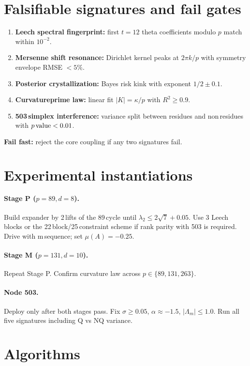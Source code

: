 \documentclass[11pt]{article}
\theoremstyle{definition}
\begin{document}
\section{Falsifiable signatures and fail gates}
\begin{enumerate}[label=\textbf{S\arabic*}.]
\item \textbf{Leech spectral fingerprint:} first \(t=12\) theta coefficients modulo \(p\) match within \(10^{-2}\).
\item \textbf{Mersenne shift resonance:} Dirichlet kernel peaks at \(2\pi k/p\) with symmetry\,envelope RMSE \(<5\%\).
\item \textbf{Posterior crystallization:} Bayes risk kink with exponent \(1/2\pm 0.1\).
\item \textbf{Curvature\textendash prime law:} linear fit \(|K|=\kappa/p\) with \(R^2\ge 0.9\).
\item \textbf{503\,simplex interference:} variance split between residues and non\,residues with \(p\text{\,value}<0.01\).
\end{enumerate}
\medskip
\noindent \textbf{Fail fast:} reject the core coupling if any two signatures fail.

\section{Experimental instantiations}
\paragraph{Stage P (\(p=89, d=8\)).} Build expander by 2\,lifts of the 89\,cycle until \(\lambda_2\le 2\sqrt{7}+0.05\). Use 3 Leech blocks or the 22\,block/25\,constraint scheme if rank parity with 503 is required. Drive with m\,sequence; set \(\mu(A)=-0.25\).
\paragraph{Stage M (\(p=131, d=10\)).} Repeat Stage P. Confirm curvature law across \(p\in\{89,131,263\}\).
\paragraph{Node 503.} Deploy only after both stages pass. Fix \(\sigma\ge 0.05\), \(\alpha\approx -1.5\), \(|\Lambda_m|\le 1.0\). Run all five signatures including Q vs NQ variance.

\section{Algorithms}
\end{document}
